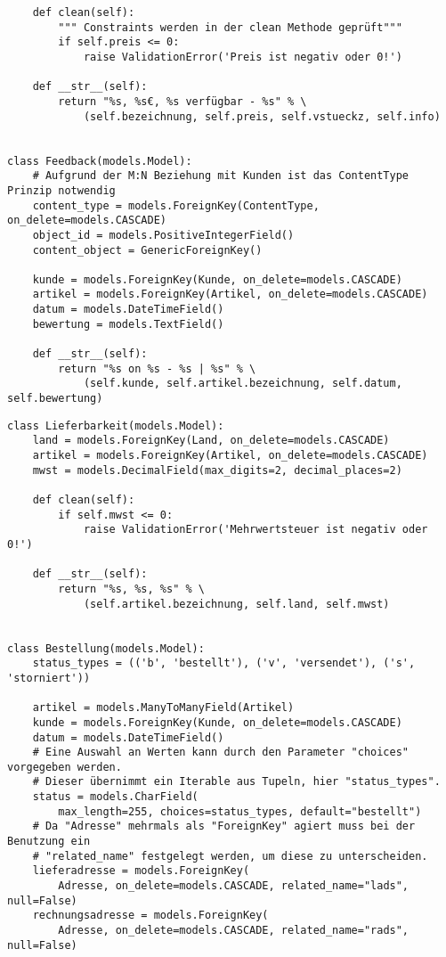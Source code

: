 \documentclass[a4paper,11pt]{article}
\begin{document}
\begin{small}
\begin{verbatim}
    def clean(self):
        """ Constraints werden in der clean Methode geprüft"""
        if self.preis <= 0:
            raise ValidationError('Preis ist negativ oder 0!')

    def __str__(self):
        return "%s, %s€, %s verfügbar - %s" % \
            (self.bezeichnung, self.preis, self.vstueckz, self.info)


class Feedback(models.Model):
    # Aufgrund der M:N Beziehung mit Kunden ist das ContentType Prinzip notwendig
    content_type = models.ForeignKey(ContentType, on_delete=models.CASCADE)
    object_id = models.PositiveIntegerField()
    content_object = GenericForeignKey()

    kunde = models.ForeignKey(Kunde, on_delete=models.CASCADE)
    artikel = models.ForeignKey(Artikel, on_delete=models.CASCADE)
    datum = models.DateTimeField()
    bewertung = models.TextField()

    def __str__(self):
        return "%s on %s - %s | %s" % \
            (self.kunde, self.artikel.bezeichnung, self.datum, self.bewertung)
\end{verbatim}

\newpage
\begin{verbatim}
class Lieferbarkeit(models.Model):
    land = models.ForeignKey(Land, on_delete=models.CASCADE)
    artikel = models.ForeignKey(Artikel, on_delete=models.CASCADE)
    mwst = models.DecimalField(max_digits=2, decimal_places=2)

    def clean(self):
        if self.mwst <= 0:
            raise ValidationError('Mehrwertsteuer ist negativ oder 0!')

    def __str__(self):
        return "%s, %s, %s" % \
            (self.artikel.bezeichnung, self.land, self.mwst)


class Bestellung(models.Model):
    status_types = (('b', 'bestellt'), ('v', 'versendet'), ('s', 'storniert'))

    artikel = models.ManyToManyField(Artikel)
    kunde = models.ForeignKey(Kunde, on_delete=models.CASCADE)
    datum = models.DateTimeField()
    # Eine Auswahl an Werten kann durch den Parameter "choices" vorgegeben werden.
    # Dieser übernimmt ein Iterable aus Tupeln, hier "status_types".
    status = models.CharField(
        max_length=255, choices=status_types, default="bestellt")
    # Da "Adresse" mehrmals als "ForeignKey" agiert muss bei der Benutzung ein
    # "related_name" festgelegt werden, um diese zu unterscheiden.
    lieferadresse = models.ForeignKey(
        Adresse, on_delete=models.CASCADE, related_name="lads", null=False)
    rechnungsadresse = models.ForeignKey(
        Adresse, on_delete=models.CASCADE, related_name="rads", null=False)


\end{verbatim}
\end{small}
\end{document}
